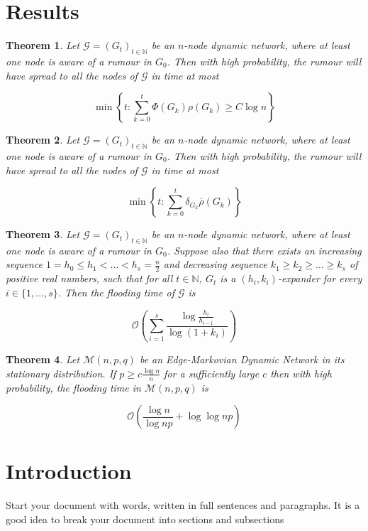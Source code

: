 \documentclass[a4paper,11pt]{article}
\newtheorem{theorem}{Theorem}[section]
\theoremstyle{definition}
\newcommand*\comp[1]{\overline{#1}}
\begin{document}
\section{Results}

\newcommand{\ModelIntro}{
	Let $\mathcal{G} = (G_t)_{t \in \mathbb{N}}$ be an $n$-node dynamic network, where at least one node is aware of a rumour in $G_0$.
}

\begin{theorem}
	\ModelIntro Then with high probability, the rumour will have spread to all the nodes of $\mathcal{G}$ in time at most

	$$
		\min \left\{t : \sum_{k=0}^t \Phi(G_k)\rho(G_k) \geq C \log n \right\} 
	$$
\end{theorem}

\begin{theorem}
	\ModelIntro Then with high probability, the rumour will have spread to all the nodes of $\mathcal{G}$ in time at most 

	$$ 
		\min \left\{ t : \sum_{k=0}^t \delta_{G_k} \comp{\rho}(G_k) \right\}
	$$
\end{theorem}

\begin{theorem}
	\ModelIntro Suppose also that there exists an increasing sequence $1 = h_0 \leq h_1 < \dots < h_s = \frac{n}{2}$ and decreasing sequence $k_1 \geq k_2 \geq \dots \geq k_s$ of positive real numbers, such that for all $t \in \mathbb{N}$, $G_t$ is a $(h_i, k_i)$-expander for every $i \in \{1, \dots , s\}$. Then the flooding time of $\mathcal{G}$ is

	$$
		\mathcal{O}\left(\sum_{i=1}^s \frac{\log \frac{h_i}{h_{i-1}}}{\log(1+k_i)}\right)
	$$
\end{theorem}

\begin{theorem}
	Let $\mathcal{M}(n, p, q)$ be an Edge-Markovian Dynamic Network in its stationary distribution. If $p \geq c \frac{\log n}{n}$ for a sufficiently large $c$ then with high probability, the flooding time in $\mathcal{M}(n, p, q)$ is 

	$$
		\mathcal{O}\left(\frac{\log n}{\log np} + \log \log np \right)
	$$
\end{theorem}

\section{Introduction}

Start your document with words, written in full sentences and paragraphs.
It is a good idea to break your document into sections and subsections
\end{document}
